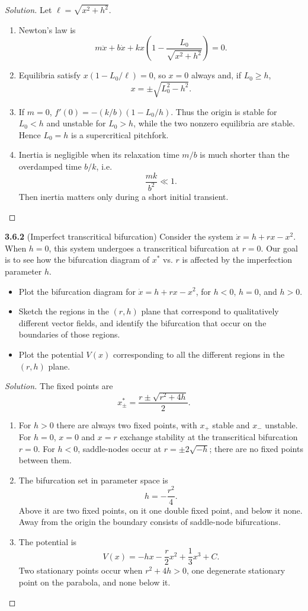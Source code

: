 \documentclass[10pt]{amsart}
\newenvironment{solution}
{\begin{proof}[Solution]}
{\end{proof}}
\begin{document}
\begin{onehalfspace}
        \begin{solution}
Let $\ell=\sqrt{x^2+h^2}$.
\begin{enumerate}[label=(\alph*)]
\item Newton's law is
\[m\ddot x+b\dot x+kx\left(1-\frac{L_0}{\sqrt{x^2+h^2}}\right)=0.\]
\item Equilibria satisfy $x(1-L_0/\ell)=0$, so $x=0$ always and, if $L_0\ge h$,
\[x=\pm\sqrt{L_0^2-h^2}.\]
\item If $m=0$, $f'(0)=-(k/b)(1-L_0/h)$. Thus the origin is stable for $L_0<h$ and unstable for $L_0>h$, while the two nonzero equilibria are stable. Hence $L_0=h$ is a supercritical pitchfork.
\item Inertia is negligible when its relaxation time $m/b$ is much shorter than the overdamped time $b/k$, i.e.
\[\frac{mk}{b^2}\ll1.\]
Then inertia matters only during a short initial transient.
\end{enumerate}
\end{solution}

        \noindent\textbf{3.6.2} (Imperfect transcritical bifurcation) Consider the system $\dot{x} = h + rx - x^2$.
        When $h = 0$, this system undergoes a transcritical bifurcation at $r = 0$.
        Our goal is to see how the bifurcation diagram of $x^*$ vs. $r$ is affected by the imperfection parameter $h$.
        \begin{itemize}
            \item[a)] Plot the bifurcation diagram for $\dot{x} = h + rx - x^2$, for $h < 0$, $h = 0$, and $h > 0$.
            \item[b)] Sketch the regions in the $(r,h)$ plane that correspond to qualitatively different vector fields,
            and identify the bifurcation that occur on the boundaries of those regions.
            \item[c)] Plot the potential $V(x)$ corresponding to all the different regions in the $(r,h)$ plane.
        \end{itemize}

        \begin{solution}
The fixed points are
\[x^*_{\pm}=\frac{r\pm\sqrt{r^2+4h}}2.\]
\begin{enumerate}[label=(\alph*)]
\item For $h>0$ there are always two fixed points, with $x_+$ stable and $x_-$ unstable. For $h=0$, $x=0$ and $x=r$ exchange stability at the transcritical bifurcation $r=0$. For $h<0$, saddle-nodes occur at $r=\pm2\sqrt{-h}$; there are no fixed points between them.
\item The bifurcation set in parameter space is
\[h=-\frac{r^2}{4}.\]
Above it are two fixed points, on it one double fixed point, and below it none. Away from the origin the boundary consists of saddle-node bifurcations.
\item The potential is
\[V(x)=-hx-\frac r2x^2+\frac13x^3+C.\]
Two stationary points occur when $r^2+4h>0$, one degenerate stationary point on the parabola, and none below it.
\end{enumerate}


\end{solution}
\end{onehalfspace}
\end{document}
